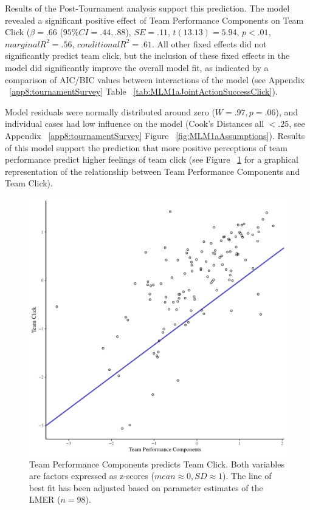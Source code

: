 \begin{CJK}{UTF8}{gbsn}
Results of the Post-Tournament analysis support this prediction. The model revealed a significant positive effect of Team Performance Components on Team Click ($\beta = .66$ ($95\% CI =  .44, .88$), $SE = .11$, $t(13.13) = 5.94$, $p < .01$, $marginal R^2 = .56$, $conditional R^2 = .61$.  All other fixed effects did not significantly predict team click, but the inclusion of these fixed effects in the model did significantly improve the overall model fit, as indicated by a comparison of AIC/BIC values between interactions of the model (see Appendix ~\ref{app8:tournamentSurvey} Table ~\ref{tab:MLM1aJointActionSuccessClick}).

Model residuals were normally distributed around zero ($W = .97, p = .06$), and individual cases had low influence on the model (Cook's Distances all $< .25$, see Appendix ~\ref{app8:tournamentSurvey} Figure ~\ref{fig:MLM1aAssumptions}). Results of this model support the prediction that more positive perceptions of team performance predict higher feelings of team click (see Figure ~\ref{fig:jasClickModelSLope} for a graphical representation of the relationship between Team Performance Components and Team Click).

\begin{figure}[htbp]
  \centering
\includegraphics[scale = .5]{images/jasClickModelSlope}
  \caption{Team Performance Components predicts Team Click. Both variables are factors expressed as z-scores ($mean \approx 0, SD \approx 1$).  The line of best fit has been adjusted based on parameter estimates of the LMER ($n = 98$).}
  \label{fig:jasClickModelSLope}
\end{figure}




\end{CJK}
